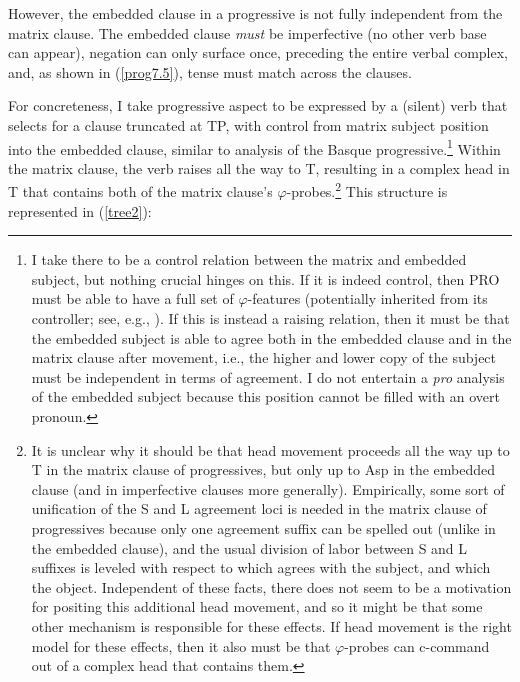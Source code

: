 \documentclass[output=paper
,modfonts
,nonflat]{langsci/langscibook}
\begin{document}
\z

\noindent However, the embedded clause in a progressive is not fully independent from the matrix clause. The embedded clause \textit{must} be imperfective (no other verb base can appear), negation can only surface once, preceding the entire verbal complex, and, as shown in (\ref{prog7.5}), tense must match across the clauses.

\eal \label{prog7.5}
\zl
For concreteness, I take progressive aspect to be expressed by a (silent) verb that selects for a clause truncated at TP, with control from matrix subject position into the embedded clause, similar to  analysis of the Basque progressive.\footnote{I take there to be a control relation between the matrix and embedded subject, but nothing crucial hinges on this. If it is indeed control, then PRO must be able to have a full set of $\varphi$-features (potentially inherited from its controller; see, e.g., \citealt{Ussery08}). If this is instead a raising relation, then it must be that the embedded subject is able to agree both in the embedded clause and in the matrix clause after movement, i.e., the higher and lower copy of the subject must be independent in terms of agreement. I do not entertain a \textit{pro} analysis of the embedded subject because this position cannot be filled with an overt pronoun.} Within the matrix clause, the verb raises all the way to T, resulting in a complex head in T that contains both of the matrix clause's $\varphi$-probes.\footnote{It is unclear why it should be that head movement proceeds all the way up to T in the matrix clause of progressives, but only up to Asp in the embedded clause (and in imperfective clauses more generally). Empirically, some sort of unification of the S and L agreement loci is needed in the matrix clause of progressives because only one agreement suffix can be spelled out (unlike in the embedded clause), and the usual division of labor between S and L suffixes is leveled with respect to which agrees with the subject, and which the object. Independent of these facts, there does not seem to be a motivation for positing this additional head movement, and so it might be that some other mechanism is responsible for these effects. If head movement is the right model for these effects, then it also must be that $\varphi$-probes can c-command out of a complex head that contains them.} This structure is represented in (\ref{tree2}):
\end{document}
